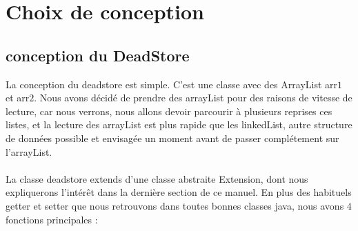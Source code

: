 \documentclass[a4paper]{article}
\begin{document}
\section{Choix de conception}
\subsection{conception du DeadStore}
La conception du deadstore est simple. C'est une classe avec des ArrayList arr$1$ et arr$2$. Nous avons décidé de prendre des arrayList pour des raisons de vitesse de lecture, car nous verrons, nous allons devoir parcourir à plusieurs reprises ces listes, et la lecture des arrayList est plus rapide que les linkedList, autre structure de données possible et envisagée un moment avant de passer complétement sur l'arrayList.\\ \\
La classe deadstore extends d'une classe abstraite Extension, dont nous expliquerons l'intérêt dans la dernière section de ce manuel. En plus des habituels getter et setter que nous retrouvons dans toutes bonnes classes java, nous avons $4$ fonctions principales :
\end{document}
